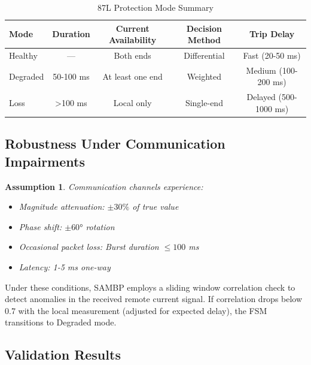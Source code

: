 \documentclass[12pt,a4paper]{article}
\newtheorem{assumption}[theorem]{Assumption}
\begin{document}
\begin{table}[H]
\centering
\caption{87L Protection Mode Summary}
\label{tab:87l_modes}
\begin{tabular}{lcccc}
\toprule
\textbf{Mode} & \textbf{Duration} & \textbf{Current Availability} & \textbf{Decision Method} & \textbf{Trip Delay} \\
\midrule
Healthy & — & Both ends & Differential & Fast (20-50 ms) \\
Degraded & 50-100 ms & At least one end & Weighted & Medium (100-200 ms) \\
Loss & >100 ms & Local only & Single-end & Delayed (500-1000 ms) \\
\bottomrule
\end{tabular}
\end{table}

\subsection{Robustness Under Communication Impairments}
\label{subsec:87l_robustness}

\begin{assumption}
\label{asm:87l_channels}
Communication channels experience:
\begin{itemize}
    \item Magnitude attenuation: $\pm 30\%$ of true value
    \item Phase shift: $\pm 60°$ rotation
    \item Occasional packet loss: Burst duration $\leq 100$ ms
    \item Latency: 1-5 ms one-way
\end{itemize}
\end{assumption}

Under these conditions, SAMBP employs a sliding window correlation check to detect 
anomalies in the received remote current signal. If correlation drops below 0.7 with 
the local measurement (adjusted for expected delay), the FSM transitions to Degraded mode.

\subsection{Validation Results}
\label{subsec:87l_results}
\end{document}
